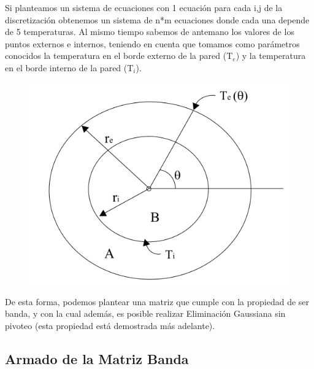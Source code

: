 Si planteamos un sistema de ecuaciones con 1 ecuaci\'on para cada i,j de la discretizaci\'on obtenemos un sistema de n*m ecuaciones donde cada una depende de 5 temperaturas. Al mismo tiempo sabemos de antemano los valores de los puntos externos e internos, teniendo en cuenta que tomamos como par\'ametros conocidos la temperatura en el borde externo de la pared (T$_e$) y la temperatura en el borde interno de la pared (T$_i$).

\begin{figure}[ht]
\begin{center}
\includegraphics[width=0.4\columnwidth]{../tp1-package/docs/Horno.png}
\end{center}
\end{figure}

De esta forma, podemos plantear una matriz que cumple con la propiedad de ser banda, y con la cual además, es posible realizar Eliminación Gaussiana sin pivoteo (esta propiedad está demostrada más adelante).

\subsection{Armado de la Matriz Banda}
\label{subsec:DemBanda}

